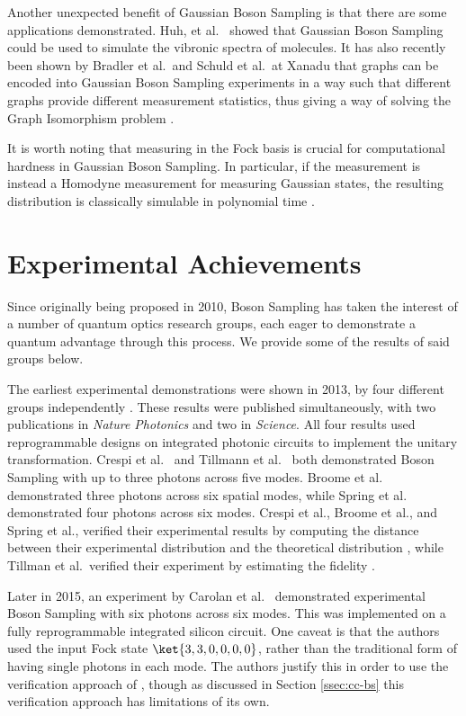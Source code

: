 Another unexpected benefit of Gaussian Boson Sampling is that there are some applications demonstrated. Huh, et al.~\cite{huh2015} showed that Gaussian Boson Sampling could be used to simulate the vibronic spectra of molecules. It has also recently been shown by Bradler et al.\ and Schuld et al.\ at Xanadu that graphs can be encoded into Gaussian Boson Sampling experiments in a way such that different graphs provide different measurement statistics, thus giving a way of solving the Graph Isomorphism problem \cite{bradler2018, schuld2019}.

It is worth noting that measuring in the Fock basis is crucial for computational hardness in Gaussian Boson Sampling. In particular, if the measurement is instead a Homodyne measurement for measuring Gaussian states, the resulting distribution is classically simulable in polynomial time \cite{bartlett2003}.

\section{Experimental Achievements}
\label{sec:experimental-achievements}

Since originally being proposed in 2010, Boson Sampling has taken the interest of a number of quantum optics research groups, each eager to demonstrate a quantum advantage through this process. We provide some of the results of said groups below.

The earliest experimental demonstrations were shown in 2013, by four different groups independently \cite{broome2013, spring2013, tillmann2013, crespi2013}. These results were published simultaneously, with two publications in \emph{Nature Photonics} and two in \emph{Science}. All four results used reprogrammable designs on integrated photonic circuits to implement the unitary transformation. Crespi et al.~\cite{crespi2013} and Tillmann et al.~\cite{tillmann2013} both demonstrated Boson Sampling with up to three photons across five modes. Broome et al.~\cite{broome2013} demonstrated three photons across six spatial modes, while Spring et al.~\cite{spring2013} demonstrated four photons across six modes. Crespi et al., Broome et al., and Spring et al., verified their experimental results by computing the distance between their experimental distribution and the theoretical distribution \cite{spring2013, tillmann2013, crespi2013}, while Tillman et al.\ verified their experiment by estimating the fidelity \cite{tillmann2013}.

Later in 2015, an experiment by Carolan et al.~\cite{carolan2015} demonstrated experimental Boson Sampling with six photons across six modes. This was implemented on a fully reprogrammable integrated silicon circuit. One caveat is that the authors used the input Fock state $\ket{3,3,0,0,0,0}$, rather than the traditional form of having single photons in each mode. The authors justify this in order to use the verification approach of \cite{carolan2014}, though as discussed in Section \ref{ssec:cc-bs} this verification approach has limitations of its own.

